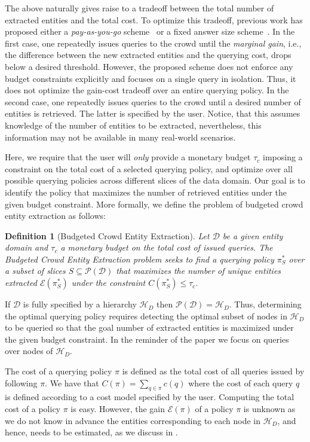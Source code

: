 \documentclass{sig-alternate}
\newtheorem{definition}{Definition}
\newcommand{\domain}{\mathcal{D}}
\newcommand{\hierarchy}{\mathcal{H}_D}
\newcommand{\uentities}{\mathcal{E}}
\begin{document}
The above naturally gives raise to a tradeoff between the total number of extracted entities and the total cost. To optimize this tradeoff, previous work has proposed either a {\em pay-as-you-go} scheme~\cite{trushkowsky:2013} or a fixed answer size scheme~\cite{park:2014}. In the first case, one repeatedly issues queries to the crowd until the {\em marginal gain}, i.e., the difference between the new extracted entities and the querying cost, drops below a desired threshold. However, the proposed scheme does not enforce any budget constraints explicitly and focuses on a single query in isolation. Thus, it does not optimize the gain-cost tradeoff over an entire querying policy. In the second case, one repeatedly issues queries to the crowd until a desired number of entities is retrieved. The latter is specified by the user. Notice, that this assumes knowledge of the number of entities to be extracted, nevertheless, this information may not be available in many real-world scenarios. 

Here, we require that the user will {\em only} provide a monetary budget $\tau_c$ imposing a constraint on the total cost of a selected querying policy, and optimize over all possible querying policies across different slices of the data domain. Our goal is to identify the policy that maximizes the number of retrieved entities under the given budget constraint. More formally, we define the problem of budgeted crowd entity extraction as follows:

\begin{definition}[Budgeted Crowd Entity Extraction]
Let $\domain$ be a given entity domain and $\tau_c$ a monetary budget on the total cost of issued queries. The Budgeted Crowd Entity Extraction problem seeks to find 
a querying policy $\pi^*_S$ over a subset of slices $S \subseteq \mathcal{P}(\domain)$ that maximizes the number of unique entities extracted $\uentities(\pi^*_S)$ under the constraint $C(\pi^*_S) \leq \tau_c$.
\end{definition}

If $\domain$ is fully specified by a hierarchy $\hierarchy$ then $\mathcal{P}(\domain) = \hierarchy$. Thus, determining the optimal querying policy requires detecting the optimal subset of nodes in $\hierarchy$ to be queried so that the goal number of extracted entities is maximized under the given budget constraint. In the reminder of the paper we focus on queries over nodes of $\hierarchy$.

The cost of a querying policy $\pi$ is defined as the total cost of all queries issued by following $\pi$. We have that $C(\pi) = \sum_{q \in \pi} c(q)$ where the cost of each query $q$ is defined according to a cost model specified by the user. Computing the total cost of a policy $\pi$ is easy. However, the gain $\uentities(\pi)$ of a policy $\pi$ is unknown as we do not know in advance the entities corresponding to each node in $\hierarchy$, and hence, needs to be estimated, as we discuss in . 
\end{document}
